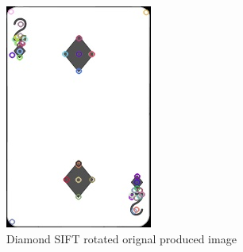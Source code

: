 \documentclass[conference]{IEEEtran}
\begin{document}
\begin{figure}[!htb]
  \centering
  \begin{minipage}[b]{0.2\textwidth}
    \includegraphics[width=\textwidth]{../programme/results/Task_1/rotated_experiements/SIFT/diamond/image_0.jpg}
    \caption{Diamond SIFT rotated orignal produced image}
    \label{Diamond SIFT rotated orignal produced image}
  \end{minipage}
  \hfill
  \begin{minipage}[b]{0.2\textwidth}

\end{minipage}
\end{figure}
\end{document}
